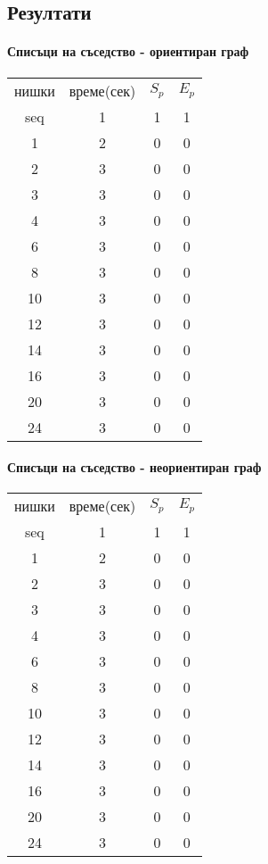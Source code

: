 \subsection{Резултати}

\paragraph*{Списъци на съседство - ориентиран граф}

\begin{center}
\begin{tabular}{ c c c c }
  нишки & време(сек) & $S_p$ & $E_p$ \\
  seq & 1 & 1 & 1 \\
  1 & 2 & 0 & 0 \\
  2 & 3 & 0 & 0 \\
  3 & 3 & 0 & 0 \\
  4 & 3 & 0 & 0 \\
  6 & 3 & 0 & 0 \\
  8 & 3 & 0 & 0 \\
  10 & 3 & 0 & 0 \\
  12 & 3 & 0 & 0 \\
  14 & 3 & 0 & 0 \\
  16 & 3 & 0 & 0 \\
  20 & 3 & 0 & 0 \\
  24 & 3 & 0 & 0 \\
\end{tabular}
\end{center}

\paragraph*{Списъци на съседство - неориентиран граф}

\begin{center}
\begin{tabular}{ c c c c }
  нишки & време(сек) & $S_p$ & $E_p$ \\
  seq & 1 & 1 & 1 \\
  1 & 2 & 0 & 0 \\
  2 & 3 & 0 & 0 \\
  3 & 3 & 0 & 0 \\
  4 & 3 & 0 & 0 \\
  6 & 3 & 0 & 0 \\
  8 & 3 & 0 & 0 \\
  10 & 3 & 0 & 0 \\
  12 & 3 & 0 & 0 \\
  14 & 3 & 0 & 0 \\
  16 & 3 & 0 & 0 \\
  20 & 3 & 0 & 0 \\
  24 & 3 & 0 & 0 \\
\end{tabular}
\end{center}

